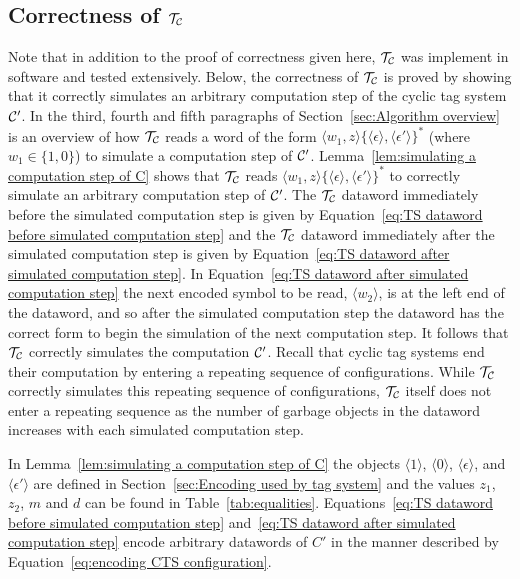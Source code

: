 \documentclass[11pt]{article} \usepackage{amsfonts,amsmath,amssymb,amsthm}
\newcommand{\tne}[1]{\ensuremath{\langle #1\rangle}}
\newcommand{\encodeOne}{\tne{1}}
\newcommand{\encodeZero}{\tne{0}}
\newcommand{\encodeDeletion}{\tne{\epsilon}}
\newcommand{\encodeDeletionPrime}{\tne{\epsilon'}}
\begin{document}
\subsection{Correctness of $\mathcal{T_{\mathcal{C}}}$}
Note that in addition to the proof of correctness given here, $\mathcal{T_{\mathcal{C}}}$ was implement in software and tested extensively. Below, the correctness of $\mathcal{T_{\mathcal{C}}}$ is proved by showing that it correctly simulates an arbitrary computation step of the cyclic tag system $\mathcal{C'}$. In the third, fourth and fifth paragraphs of Section~\ref{sec:Algorithm overview} is an overview of how $\mathcal{T_{\mathcal{C}}}$ reads a word of the form $\tne{w_1,z}\{\encodeDeletion,\encodeDeletionPrime\}^\ast$ (where $w_1\in\{1,0\}$) to simulate a computation step of $\mathcal{C'}$. Lemma~\ref{lem:simulating a computation step of C} shows that $\mathcal{T_{\mathcal{C}}}$ reads $\tne{w_1,z}\{\encodeDeletion,\encodeDeletionPrime\}^\ast$ to correctly simulate an arbitrary computation step of $\mathcal{C'}$. The $\mathcal{T_{\mathcal{C}}}$ dataword immediately before the simulated computation step is given by Equation~\eqref{eq:TS dataword before simulated computation step} and the $\mathcal{T_{\mathcal{C}}}$ dataword immediately after the simulated computation step is given by Equation~\eqref{eq:TS dataword after simulated computation step}. In Equation~\eqref{eq:TS dataword after simulated computation step} the next encoded symbol to be read, $\tne{w_2}$, is at the left end of the dataword, and so after the simulated computation step  the dataword has the correct form to begin the simulation of the next computation step. It follows that $\mathcal{T_{\mathcal{C}}}$ correctly simulates the computation $\mathcal{C'}$. Recall that cyclic tag systems end their computation by entering a repeating sequence of configurations. While $\mathcal{T_{\mathcal{C}}}$ correctly simulates this repeating sequence of configurations, $\mathcal{T_{\mathcal{C}}}$ itself does not enter a repeating sequence as the number of garbage objects in the dataword increases with each simulated computation step.   


In Lemma~\ref{lem:simulating a computation step of C} the objects $\encodeOne$, $\encodeZero$, $\encodeDeletion$, and $\encodeDeletionPrime$ are defined in Section~\ref{sec:Encoding used by tag system} and the values $z_1$, $z_2$, $m$ and $d$ can be found in Table~\ref{tab:equalities}. Equations~\eqref{eq:TS dataword before simulated computation step} and~\eqref{eq:TS dataword after simulated computation step} encode arbitrary datawords of $C'$ in the manner described by Equation~\eqref{eq:encoding CTS configuration}.
\end{document}
